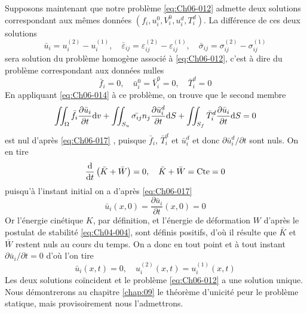 Supposons maintenant que notre problème \eqref{eq:Ch06-012} admette deux solutions correspondant aux mêmes données $\left( f_i, u_i^0, V_i^0, u_i^d, T_i^d \right)$.
La différence de ces deux solutions
\begin{equation}
    \bar{u}_i = u_i^{(2)} - u_i^{(1)}, \quad \bar{\varepsilon}_{ij} = \varepsilon_{ij}^{(2)} - \varepsilon_{ij}^{(1)}, \quad  \bar{\sigma}_{ij} = \sigma_{ij}^{(2)} - \sigma_{ij}^{(1)}
    \label{eq:Ch06-016}
\end{equation}
sera solution du problème homogène associé à \eqref{eq:Ch06-012}, c'est à dire du problème correspondant aux données nulles
\begin{equation}
    \bar{f}_i = 0, \quad \bar{u}_i^0 = \bar{V}_i^0 = 0, \quad \bar{T}_i^d= 0
    \label{eq:Ch06-017}
\end{equation}
En appliquant \eqref{eq:Ch06-014} à ce problème, on trouve que le second membre
\begin{equation}
    \iint_{\Omega} \bar{f}_i \frac{\partial \bar{u}_i}{\partial t} \mathrm{d} v + \iint_{S_u} \bar{\sigma_{ij}} n_j \frac{\partial \bar{u}_i^d}{\partial t} \mathrm{d} S + \iint_{S_f} \bar{T}_i^d \frac{\partial \bar{u}_i}{\partial t} \mathrm{d} S = 0
    \label{eq:Ch06-018}
\end{equation}
est nul d'après \eqref{eq:Ch06-017} , puisque $\bar{f}_i$, $\bar{T}_i^d$ et $\bar{u}_i^d$ et donc $\partial \bar{u}_i^d/\partial t$ sont nuls.
On en tire
\begin{equation}
    \frac{\mathrm{d}}{\mathrm{d} t} \left( \bar{K} + \bar{W} \right) = 0, \quad \bar{K} + \bar{W} = \text{Cte} = 0
    \label{eq:Ch06-019}
\end{equation}
puisqu'à l'instant initial on a d'après \eqref{eq:Ch06-017}
\begin{equation}
    \bar{u}_i \left( x,0 \right) = \frac{\partial \bar{u}_i}{\partial t} \left( x,0 \right) = 0
    \label{eq:Ch06-020}
\end{equation}
Or l'énergie cinétique $K$, par définition, et l'énergie de déformation $W$ d'après le postulat de stabilité \eqref{eq:Ch04-004}, sont définis positifs, d'où il résulte que $\bar{K}$ et $\bar{W}$ restent nuls au cours du temps.
On a donc en tout point et à tout instant $\partial \bar{u}_i/\partial t = 0$ d'où l'on tire
\begin{equation}
    \bar{u}_i \left( x,t \right) = 0, \quad u_i^{(2)} \left( x,t \right) = u_i^{(1)} \left( x,t \right)
    \label{eq:Ch06-021}
\end{equation}
Les deux solutions coïncident et le problème \eqref{eq:Ch06-012} a une solution unique.
Nous démontrerons au chapitre \ref{chap:09} le théorème d'unicité peur le problème statique, mais provisoirement nous l'admettrons.

